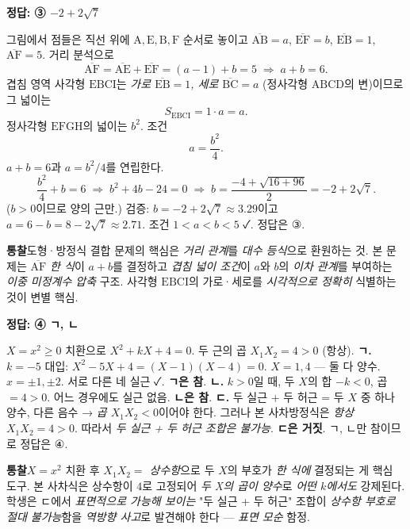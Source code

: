 \documentclass[10pt]{article}
\newcommand{\solnote}[1]{\par\smallskip\noindent
  \begin{tcolorbox}[enhanced, breakable, colback=vB-light, colframe=vB-light,
    boxrule=0pt, arc=3pt, left=10pt, right=10pt, top=4pt, bottom=4pt,
    fontupper=\sffamily\footnotesize\color{vB-ink}]
    \textbf{\color{vB-deep}통찰}\quad #1
  \end{tcolorbox}}
\begin{document}
\begin{answerbox}\sffamily\bfseries 정답: ③ $-2 + 2\sqrt{7}$\end{answerbox}
 그림에서 점들은 직선 위에 $\mathrm{A, E, B, F}$ 순서로 놓이고 $\overline{\mathrm{AB}} = a$, $\overline{\mathrm{EF}} = b$, $\overline{\mathrm{EB}} = 1$, $\overline{\mathrm{AF}} = 5$.
 거리 분석으로
\[ \overline{\mathrm{AF}} = \overline{\mathrm{AE}} + \overline{\mathrm{EF}} = (a - 1) + b = 5 \;\Longrightarrow\; a + b = 6. \]
 겹침 영역 사각형 $\mathrm{EBCI}$는 \emph{가로 $\overline{\mathrm{EB}} = 1$, 세로 $\overline{\mathrm{BC}} = a$} (정사각형 $\mathrm{ABCD}$의 변)이므로 그 넓이는
\[ S_{\mathrm{EBCI}} = 1 \cdot a = a. \]
 정사각형 $\mathrm{EFGH}$의 넓이는 $b^2$. 조건
\[ a = \frac{b^2}{4}. \]
 $a + b = 6$과 $a = b^2/4$를 연립한다.
\[ \frac{b^2}{4} + b = 6 \;\Longrightarrow\; b^2 + 4b - 24 = 0 \;\Longrightarrow\; b = \frac{-4 + \sqrt{16 + 96}}{2} = -2 + 2\sqrt{7}. \]
($b > 0$이므로 양의 근만.)
 검증: $b = -2 + 2\sqrt{7} \approx 3.29$이고 $a = 6 - b = 8 - 2\sqrt{7} \approx 2.71$. 조건 $1 < a < b < 5$ ✓.
정답은 $\textbf{③}$.
\solnote{도형·방정식 결합 문제의 핵심은 \emph{거리 관계}를 \emph{대수 등식}으로 환원하는 것. 본 문제는 \emph{$\overline{\mathrm{AF}}$ 한 식}이 $a + b$를 결정하고 \emph{겹침 넓이 조건}이 $a$와 $b$의 \emph{이차 관계}를 부여하는 \emph{이중 미정계수 압축} 구조. 사각형 $\mathrm{EBCI}$의 가로·세로를 \emph{시각적으로 정확히} 식별하는 것이 변별 핵심.}

\begin{answerbox}\sffamily\bfseries 정답: ④ ㄱ, ㄴ\end{answerbox}
 $X = x^2 \ge 0$ 치환으로 $X^2 + kX + 4 = 0$. 두 근의 곱 $X_1 X_2 = 4 > 0$ (항상).
 \textbf{ㄱ.} $k = -5$ 대입: $X^2 - 5X + 4 = (X - 1)(X - 4) = 0$. $X = 1, 4$ — 둘 다 양수. $x = \pm 1, \pm 2$. 서로 다른 네 실근 ✓. \textbf{ㄱ은 참}.
 \textbf{ㄴ.} $k > 0$일 때, 두 $X$의 합 $-k < 0$, 곱 $= 4 > 0$.
어느 경우에도 실근 없음. \textbf{ㄴ은 참}.
 \textbf{ㄷ.} 두 실근 + 두 허근 = 두 $X$ 중 하나 양수, 다른 음수 → \emph{곱 $X_1 X_2 < 0$}이어야 한다. 그러나 본 사차방정식은 \emph{항상} $X_1 X_2 = 4 > 0$. 따라서 \emph{두 실근 + 두 허근 조합은 불가능}. \textbf{ㄷ은 거짓}.
 ㄱ, ㄴ만 참이므로 정답은 $\textbf{④}$.
\solnote{$X = x^2$ 치환 후 \emph{$X_1 X_2 = $ 상수항}으로 두 $X$의 부호가 \emph{한 식에} 결정되는 게 핵심 도구. 본 사차식은 상수항이 $4$로 고정되어 \emph{두 X의 곱이 양수}로 \emph{어떤 $k$에서도} 강제된다. 학생은 ㄷ에서 \emph{표면적으로 가능해 보이는} "두 실근 + 두 허근" 조합이 \emph{상수항 부호로 절대 불가능}함을 \emph{역방향 사고}로 발견해야 한다 — \emph{표면 모순} 함정.}
\end{document}
